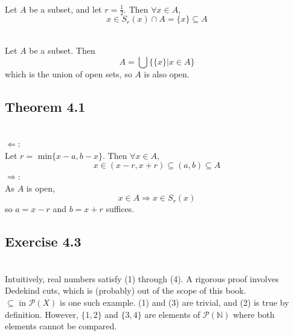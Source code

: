 \begin{solution}
 \\Let $A$ be a subset, and let $r = \frac{1}{2}$. Then $\forall x \in A$,
 $$x \in S_r(x) \cap A = \{x\} \subseteq A$$
\end{solution}


\begin{solution}
 \\Let $A$ be a subset. Then
 $$A = \bigcup\{\{x\}|x \in A\}$$
 which is the union of open sets, so $A$ is also open.
\end{solution}

\subsection{Theorem 4.1}


\begin{solution}
 \\$\Leftarrow$: \\
 Let $r =$ min$\{x-a,b-x\}$. Then $\forall x \in A$,
 $$x \in (x-r,x+r) \subseteq (a,b) \subseteq A$$
 $\Rightarrow$: \\
 As $A$ is open,
 $$x \in A \Rightarrow x \in S_r(x)$$
 so $a = x - r$ and $b = x + r$ suffices.
\end{solution}

\subsection{Exercise 4.3}


\begin{solution}
 \\Intuitively, real numbers satisfy (1) through (4). A rigorous proof involves Dedekind cuts, which is (probably) out of the scope of this book. \\
 $\subseteq$ in $\mathcal{P}(X)$ is one such example. (1) and (3) are trivial, and (2) is true by definition. However, $\{1,2\}$ and $\{3,4\}$ are elements of $\mathcal{P}(\mathbb{N})$ where both elements cannot be compared.
\end{solution}
